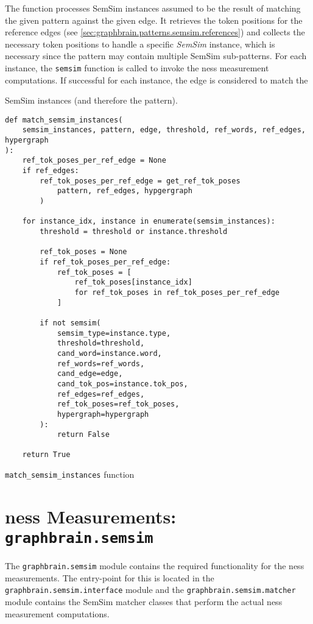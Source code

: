 \documentclass[11pt]{scrreprt}
\begin{document}
The function processes SemSim instances assumed to be the result of matching the given pattern against the given edge. It retrieves the token positions for the reference edges (see \cref{sec:graphbrain.patterns.semsim.references}) and collects the necessary token positions to handle a specific \textit{SemSim} instance, which is necessary since the pattern may contain multiple SemSim  sub-patterns. For each instance, the \texttt{semsim} function is called to invoke the \gls{ness} measurement computations. If successful for each instance, the edge is considered to match the {SemSim instances (and therefore the pattern).
 
\begin{pseudo}
\begin{lstlisting}
def match_semsim_instances(
    semsim_instances, pattern, edge, threshold, ref_words, ref_edges, hypergraph
):
    ref_tok_poses_per_ref_edge = None
    if ref_edges:
        ref_tok_poses_per_ref_edge = get_ref_tok_poses
            pattern, ref_edges, hypgergraph
        ) 
   
    for instance_idx, instance in enumerate(semsim_instances):
        threshold = threshold or instance.threshold

        ref_tok_poses = None
        if ref_tok_poses_per_ref_edge:
            ref_tok_poses = [
                ref_tok_poses[instance_idx]
                for ref_tok_poses in ref_tok_poses_per_ref_edge
            ]

        if not semsim(
            semsim_type=instance.type,
            threshold=threshold,
            cand_word=instance.word,
            ref_words=ref_words,
            cand_edge=edge,
            cand_tok_pos=instance.tok_pos,
            ref_edges=ref_edges,
            ref_tok_poses=ref_tok_poses,
            hypergraph=hypergraph
        ):
            return False

    return True
\end{lstlisting}
\caption{\texttt{match\_semsim\_instances} function}
\label{psd:match-semsim-instancess-function}
\end{pseudo}

 
\section{\gls{ness} Measurements: \texttt{graphbrain.semsim}}
The \texttt{graphbrain.semsim} module contains the required functionality for the \gls{ness} measurements. The entry-point for this is located in the \texttt{graphbrain.semsim.interface} module and the \texttt{graphbrain.semsim.matcher} module contains the SemSim matcher classes that perform the actual \gls{ness} measurement computations.


}
\end{document}

